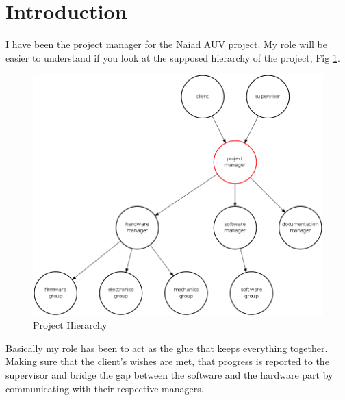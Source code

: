\section{Introduction}\label{sec:introduction}
I have been the project manager for the Naiad AUV project. My role will be easier to understand if you look at the supposed hierarchy of the project, Fig \ref{fig:hierarchy}.

\begin{figure}[!ht]
\begin{center} 
\includegraphics[scale=0.22]{figure/hierarchy.png} \caption{Project Hierarchy} 
\label{fig:hierarchy} 
\end{center} 
\end{figure}

Basically my role has been to act as the glue that keeps everything together. Making sure that the client's wishes are met, that progress is reported to the supervisor and bridge the gap between the software and  the hardware part by communicating with their respective managers.